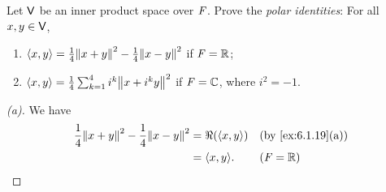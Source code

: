 \begin{ex}\label{ex:6.1.20}
  Let \(\mathsf{V}\) be an inner product space over \(\mathit{F}\).
  Prove the \emph{polar identities}:
  For all \(x, y \in \mathsf{V}\),
  \begin{enumerate}
    \item \(\inn{x, y} = \frac{1}{4} \norm{x + y}^2 - \frac{1}{4} \norm{x - y}^2\) if \(\mathit{F} = \mathbb{R}\);
    \item \(\inn{x, y} = \frac{1}{4} \sum_{k = 1}^4 i^k \norm{x + i^k y}^2\) if \(\mathit{F} = \mathbb{C}\), where \(i^2 = -1\).
  \end{enumerate}
\end{ex}

\begin{proof}[(a)]
  We have
  \begin{align*}
    \frac{1}{4} \norm{x + y}^2 - \frac{1}{4} \norm{x - y}^2 & = \Re(\inn{x, y}) &  & \text{(by \cref{ex:6.1.19}(a))} \\
                                                            & = \inn{x, y}.     &  & (\F = \R)
  \end{align*}
\end{proof}

